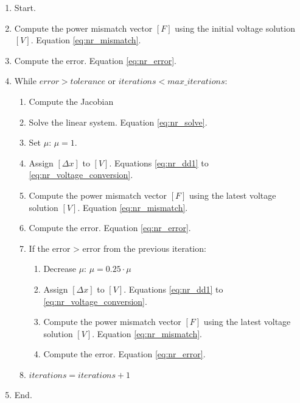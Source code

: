 \documentclass[nols,a4paper,twoside,notoc,fleqn]{tufte-book}
\begin{document}
\begin{enumerate}

\item Start.

\item Compute the power mismatch vector $[F]$ using the initial voltage solution $[V]$. Equation \ref{eq:nr_mismatch}.

\item Compute the error. Equation \ref{eq:nr_error}.

\item While $error > tolerance$ or $iterations < max\_iterations$:

	\begin{enumerate}
	\item Compute the Jacobian
	
	\item Solve the linear system. Equation \ref{eq:nr_solve}.
	
	\item Set $\mu$: $\mu = 1$.
	
	\item Assign $[\Delta x]$ to $[V]$. Equations \ref{eq:nr_dd1} to \ref{eq:nr_voltage_conversion}.
	
	\item Compute the power mismatch vector $[F]$ using the latest voltage solution $[V]$. Equation \ref{eq:nr_mismatch}.
	
	\item Compute the error. Equation \ref{eq:nr_error}.
	
	\item If the error > error from the previous iteration:
	\begin{enumerate}
		\item Decrease $\mu$: $\mu = 0.25 \cdot \mu $
		
		\item Assign $[\Delta x]$ to $[V]$. Equations \ref{eq:nr_dd1} to \ref{eq:nr_voltage_conversion}.
		
		\item Compute the power mismatch vector $[F]$ using the latest voltage solution $[V]$. Equation \ref{eq:nr_mismatch}.
		
		\item Compute the error. Equation \ref{eq:nr_error}.
	\end{enumerate}
	
	\item $iterations = iterations + 1$
	\end{enumerate}

\item End.
\end{enumerate}
\end{document}
